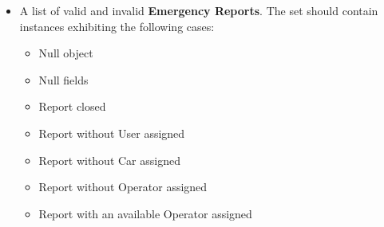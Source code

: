		\begin{itemize}
			\item A list of valid and invalid \textbf{Emergency Reports}. The set should contain instances exhibiting the following cases:
				\begin{itemize}
					\item Null object
					\item Null fields
					\item Report closed
					\item Report without User assigned
					\item Report without Car assigned
					\item Report without Operator assigned
					\item Report with an available Operator assigned
				\end{itemize}
		\end{itemize}